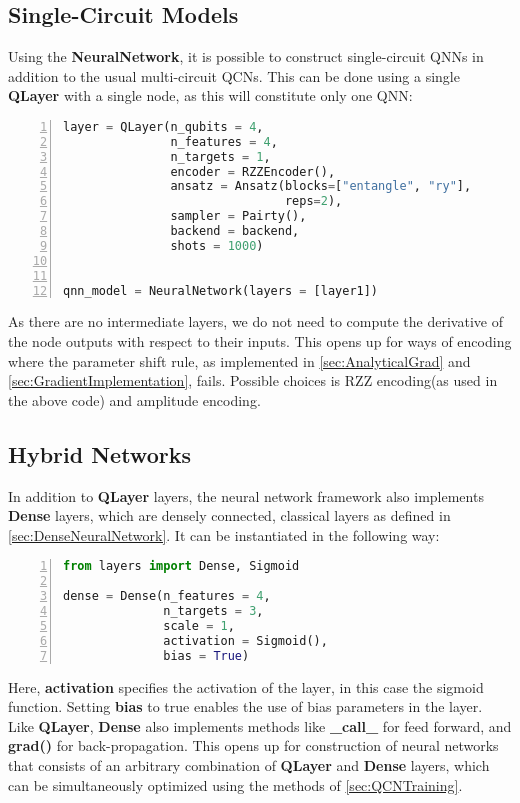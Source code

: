 \subsection{Single-Circuit Models}\label{sec:Single-CircuitModel}
Using the \textbf{NeuralNetwork}, it is possible to construct single-circuit QNNs in addition to the usual multi-circuit QCNs. This can be done using a single \textbf{QLayer} with a single node, as this will constitute only one QNN:
\begin{lstlisting}[language=python, numbers=left]
layer = QLayer(n_qubits = 4,
               n_features = 4,
               n_targets = 1,
               encoder = RZZEncoder(),
               ansatz = Ansatz(blocks=["entangle", "ry"],
                               reps=2),
               sampler = Pairty(),
               backend = backend,
               shots = 1000)
                               

qnn_model = NeuralNetwork(layers = [layer1])
\end{lstlisting}
As there are no intermediate layers, we do not need to compute the derivative of the node outputs with respect to their inputs. This opens up for ways of encoding where the parameter shift rule, as implemented in \autoref{sec:AnalyticalGrad} and \autoref{sec:GradientImplementation}, fails. Possible choices is RZZ encoding(as used in the above code) and amplitude encoding.

\subsection{Hybrid Networks}\label{sec:Hybrid Networks}
In addition to \textbf{QLayer} layers, the neural network framework also implements \textbf{Dense} layers, which are densely connected, classical layers as defined in \autoref{sec:DenseNeuralNetwork}. It can be instantiated in the following way:

\begin{lstlisting}[language=python, numbers=left]
from layers import Dense, Sigmoid

dense = Dense(n_features = 4,
              n_targets = 3,
              scale = 1,
              activation = Sigmoid(),
              bias = True)
\end{lstlisting}
Here, \textbf{activation} specifies the activation of the layer, in this case the sigmoid function. Setting \textbf{bias} to true enables the use of bias parameters in the layer. Like \textbf{QLayer}, \textbf{Dense} also implements methods like \textbf{\_call\_} for feed forward, and \textbf{grad()} for back-propagation. This opens up for construction of neural networks that consists of an arbitrary combination of \textbf{QLayer} and \textbf{Dense} layers, which can be simultaneously optimized using the methods of \autoref{sec:QCNTraining}.

